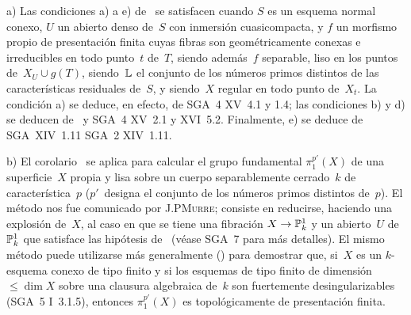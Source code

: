 \begin{remarques}
\label{rem:XIII.4.6}
a) Las condiciones a) a e) de~ se satisfacen cuando
$S$ es un esquema normal conexo, $U$ un abierto denso de~$S$ con
inmersión cuasicompacta, y $f$ un morfismo propio de
presentación finita cuyas fibras son geométricamente conexas e
irreducibles en todo punto~$t$ de~$T$, siendo además~$f$ separable,
liso en los puntos de~$X_U\cup g(T)$, siendo~$\mathbb L$ el conjunto de los
números primos distintos de las características residuales de~$S$, y
siendo~$X$ regular en todo punto de~$X_t$. La condición a) se deduce,
en efecto, de SGA~4 XV~4.1 y 1.4; las condiciones b) y d) se deducen
de~ y SGA~4 XV~2.1 y XVI~5.2. Finalmente, e) se deduce de
{SGA~XIV~1.11}
{SGA~2 XIV~1.11}.
\par\smallskip
b) El corolario~
{}
{}
se aplica para calcular el grupo fundamental $\pi_1^{p'}(X)$ de una
superficie~$X$ propia y lisa sobre
un cuerpo separablemente cerrado~$k$ de característica~$p$
($p'$~designa el conjunto de los números primos distintos de~$p$).
El método nos fue comunicado por J.P\ptbl \textsc{Murre}; consiste en
reducirse, haciendo una explosión de~$X$, al caso en que se tiene una
fibración $X\to\mathbb P^1_k$ y un abierto~$U$ de~$\mathbb P^1_k$ que satisface
las hipótesis de~ (véase SGA~7 para más detalles). El
mismo método puede utilizarse más generalmente (\loccit) para demostrar
que, si~$X$ es un $k$-esquema conexo de tipo finito y si los esquemas
de tipo finito de dimensión $\leq\dim X$ sobre una clausura algebraica
de~$k$ son fuertemente desingularizables (SGA~5 I~3.1.5), entonces
$\pi_1^{p'}(X)$ es topológicamente de presentación finita.
\end{remarques}
